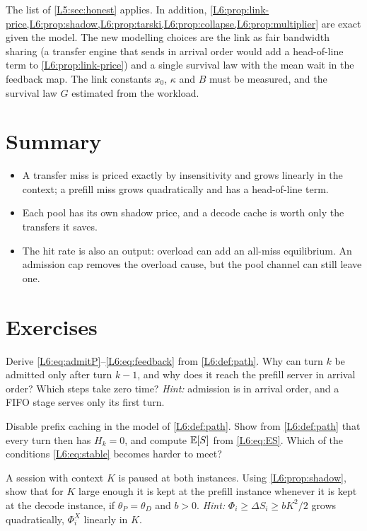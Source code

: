 The list of \cref{L5:sec:honest} applies. In addition,
\cref{L6:prop:link-price,L6:prop:shadow,L6:prop:tarski,L6:prop:collapse,L6:prop:multiplier}
are exact given the model. The new modelling choices are the link as fair bandwidth
sharing (a transfer engine that sends in arrival order would add a head-of-line term
to \cref{L6:prop:link-price}) and a single survival law with the mean wait in the
feedback map. The link constants $x_0$, $\kappa$ and $B$ must be measured, and the
survival law $G$ estimated from the workload.

\section{Summary}
\begin{itemize}
\item A transfer miss is priced exactly by insensitivity and grows linearly in the context; a prefill miss grows quadratically and has a head-of-line term.
\item Each pool has its own shadow price, and a decode cache is worth only the transfers it saves.
\item The hit rate is also an output: overload can add an all-miss equilibrium. An admission cap removes the overload cause, but the pool channel can still leave one.
\end{itemize}

\section{Exercises}

\begin{exercise}\label{L6:ex:paths}
Derive \eqref{L6:eq:admitP}--\eqref{L6:eq:feedback} from \cref{L6:def:path}. Why can
turn $k$ be admitted only after turn $k-1$, and why does it reach the prefill server in
arrival order? Which steps take zero time?
\emph{Hint:} admission is in arrival order, and a FIFO stage serves only its first turn.
\end{exercise}

\begin{exercise}\label{L6:ex:nocache}
Disable prefix caching in the model of \cref{L6:def:path}. Show from
\cref{L6:def:path} that every turn then has $H_k=0$, and compute $\mathbb{E}[S]$ from
\eqref{L6:eq:ES}. Which of the conditions \eqref{L6:eq:stable} becomes harder to meet?
\end{exercise}

\begin{exercise}\label{L6:ex:compare}
A session with context $K$ is paused at both instances. Using \cref{L6:prop:shadow},
show that for $K$ large enough it is kept at the prefill instance whenever it is kept at
the decode instance, if $\theta_P=\theta_D$ and $b>0$.
\emph{Hint:} $\Phi_i\ge\Delta S_i\ge bK^2/2$ grows quadratically, $\Phi^X_i$ linearly in $K$.
\end{exercise}

